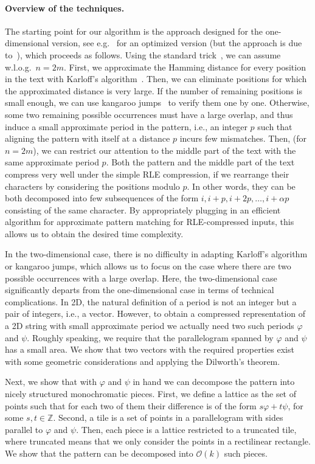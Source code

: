 \documentclass[a4paper,11pt]{article}
\newcommand{\Z}{\mathbb{Z}}
\renewcommand{\O}{\mathcal{O}}
\renewcommand{\phi}{\varphi}
\begin{document}
\paragraph{Overview of the techniques.}
The starting point for our algorithm is the approach designed for the one-dimensional version, see e.g.~\cite{Gawrychowski2018}
for an optimized version (but the approach is due to~\cite{Clifford2016}), which proceeds as follows. Using the standard trick~\cite{Abrahamson1987}, we can assume w.l.o.g.~$n = 2m$. 
First, we approximate the Hamming distance for every position in the text with Karloff's algorithm~\cite{Karloff1993}.
Then, we can eliminate positions for which the approximated distance is very large.
If the number of remaining positions is small enough, we can use kangaroo jumps~\cite{Galil1986} to verify them one by one.
Otherwise, some two remaining possible occurrences must have a large overlap, and thus induce a small approximate period in the pattern, i.e., an integer $p$ such that aligning the pattern with itself at a distance $p$ incurs few mismatches.
Then, (for $n=2m$), we can restrict our attention to the middle part of the text with the same approximate period $p$.
Both the pattern and the middle part of the text compress very well under the simple RLE compression, if we rearrange their characters
by considering the positions modulo $p$. In other words, they can be both decomposed into few subsequences
of the form $i, i+p, i+2p, \ldots, i+\alpha p$ consisting of the same character.
By appropriately plugging in an efficient algorithm for approximate pattern
matching for RLE-compressed inputs, this allows us to obtain the desired time complexity.

In the two-dimensional case, there is no difficulty in adapting Karloff's algorithm or kangaroo jumps, which allows
us to focus on the case where there are two possible occurrences with a large overlap. Here, the two-dimensional
case significantly departs from the one-dimensional case in terms of technical complications. In 2D,
the natural definition of a period is not an integer but a pair of integers, i.e., a vector.
However, to obtain a compressed representation of
a 2D string with small approximate period we actually need two such periods $\phi$ and $\psi$.
Roughly speaking, we require that the parallelogram spanned by $\phi$ and $\psi$ has a small area.
We show that two vectors with the required properties exist with some geometric considerations and
applying the Dilworth's theorem.

Next, we show that with $\phi$ and $\psi$ in hand we can decompose the pattern
into nicely structured monochromatic pieces. First, we define a lattice as the set of points such that for each two of them their difference is
of the form $s\phi+t\psi$, for some $s,t\in \Z$. Second, a tile is a set of points in a parallelogram with sides
parallel to $\phi$ and $\psi$. Then, each piece is a lattice restricted to a truncated tile, where truncated
means that we only consider the points in a rectilinear rectangle. We show that the pattern
can be decomposed into $\O(k)$ such pieces.
\end{document}
